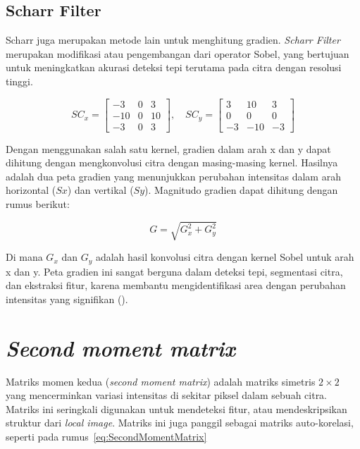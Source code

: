 \subsection{Scharr Filter}
  Scharr juga merupakan metode lain untuk menghitung gradien. \emph{Scharr Filter} merupakan modifikasi atau pengembangan dari operator Sobel, yang bertujuan untuk meningkatkan akurasi deteksi tepi terutama pada citra dengan resolusi tinggi.

\begin{equation*}
  SC_x = \begin{bmatrix}
     -3 & 0 & 3 \\
     -10 & 0 & 10 \\
      -3 & 0 & 3
  \end{bmatrix}, \quad
    SC_y = \begin{bmatrix}
      3 & 10 & 3 \\
      0 & 0 & 0 \\
     -3 & -10 & -3
  \end{bmatrix}  
\end{equation*}

Dengan menggunakan salah satu kernel, gradien dalam arah x dan y dapat dihitung dengan mengkonvolusi citra dengan masing-masing kernel. Hasilnya adalah dua peta gradien yang menunjukkan perubahan intensitas dalam arah horizontal (\(Sx\)) dan vertikal (\(Sy\)). Magnitudo gradien dapat dihitung dengan rumus berikut:

\begin{equation}
  G = \sqrt{G_x^2 + G_y^2}
\end{equation}

Di mana \(G_x\) dan \(G_y\) adalah hasil konvolusi citra dengan kernel Sobel untuk arah x dan y. Peta gradien ini sangat berguna dalam deteksi tepi, segmentasi citra, dan ekstraksi fitur, karena membantu mengidentifikasi area dengan perubahan intensitas yang signifikan (\cite{Sanchez2018}).


\section{\emph{Second moment matrix}}
  Matriks momen kedua (\emph{second moment matrix}) adalah matriks simetris \(2 \times 2\) yang mencerminkan variasi intensitas di sekitar piksel dalam sebuah citra. Matriks ini seringkali digunakan untuk mendeteksi fitur, atau mendeskripsikan struktur dari \emph{local image}.
Matriks ini juga panggil sebagai matriks auto-korelasi, seperti pada rumus~\ref{eq:SecondMomentMatrix}

